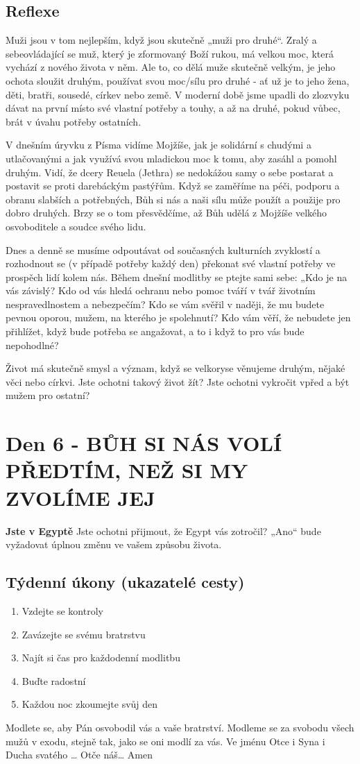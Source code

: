 \documentclass[11pt]{article}
\newcommand{\zacatekPrvniTyden}{
  \textbf{Jste v Egyptě} \newline
  Jste ochotni přijmout, že Egypt vás zotročil? „Ano“ bude vyžadovat úplnou změnu ve vašem způsobu života.

\subsection*{Týdenní úkony (ukazatelé cesty)}
\begin{enumerate}
  \item Vzdejte se kontroly
  \item Zavázejte se svému bratrstvu
  \item Najít si čas pro každodenní modlitbu
  \item Buďte radostní
  \item Každou noc zkoumejte svůj den
\end{enumerate}
Modlete se, aby Pán osvobodil vás a vaše bratrství. \newline
Modleme se za svobodu všech mužů v exodu, stejně tak, jako se oni modlí za vás.\newline
Ve jménu Otce i Syna i Ducha svatého …  Otče náš… Amen
}
\begin{document}
\subsection*{Reflexe}

Muži jsou v tom nejlepším, když jsou skutečně „muži pro druhé“. Zralý a sebeovládající se muž, který je zformovaný Boží rukou, má velkou moc, která vychází z nového života v něm.
Ale to, co dělá muže skutečně velkým, je jeho ochota sloužit druhým, používat svou moc/sílu pro druhé - ať už je to jeho žena, děti, bratři, sousedé, církev nebo země. V moderní době jsme upadli do zlozvyku dávat na první místo své vlastní potřeby a touhy, a až na druhé, pokud vůbec, brát v úvahu potřeby ostatních.

V dnešním úryvku z Písma vidíme Mojžíše, jak je solidární s chudými a utlačovanými a jak využívá svou mladickou moc k tomu, aby zasáhl a pomohl druhým. Vidí, že dcery Reuela (Jethra) se nedokážou samy o sebe postarat a postavit se proti darebáckým pastýřům.
Když se zaměříme na péči, podporu a obranu slabších a potřebných, Bůh si nás a naši sílu může použít a použije pro dobro druhých. Brzy se o tom přesvědčíme, až Bůh udělá z Mojžíše velkého osvoboditele a soudce svého lidu.

Dnes a denně se musíme odpoutávat od současných kulturních zvyklostí a rozhodnout se (v případě potřeby každý den) překonat své vlastní potřeby ve prospěch lidí kolem nás.
Během dnešní modlitby se ptejte sami sebe: „Kdo je na vás závislý? Kdo od vás hledá ochranu nebo pomoc tváří v tvář životním nespravedlnostem a nebezpečím? Kdo se vám svěřil v naději, že mu budete pevnou oporou, mužem, na kterého je spolehnutí? Kdo vám věří, že nebudete jen přihlížet, když bude potřeba se angažovat, a to i když to pro vás bude nepohodlné?

Život má skutečně smysl a význam, když se velkoryse věnujeme druhým, nějaké věci nebo církvi.
Jste ochotni takový život žít? Jste ochotni vykročit vpřed a být mužem pro ostatní?

\newpage
\section{Den 6 - BŮH SI NÁS VOLÍ PŘEDTÍM, NEŽ SI MY ZVOLÍME JEJ}
\zacatekPrvniTyden
\end{document}
